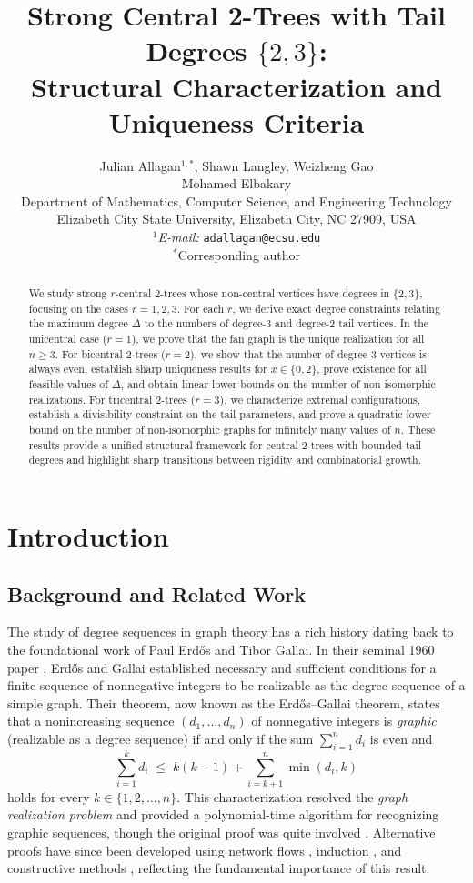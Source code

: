 \documentclass[12pt]{article}
\title{Strong Central 2-Trees with Tail Degrees \texorpdfstring{$\{2,3\}$}{\{2,3\}}:\\Structural Characterization and Uniqueness Criteria}
\author{Julian Allagan$^{1,*}$, Shawn Langley, Weizheng Gao \\ Mohamed Elbakary
 \\[0.3cm]
    \small Department of Mathematics, Computer Science, and Engineering Technology\\
    \small Elizabeth City State University, Elizabeth City, NC 27909, USA\\[0.3cm]
    \small $^{1}$\textit{E-mail:} \texttt{adallagan@ecsu.edu}\\
     \small $^{*}$Corresponding author
}
\date{}
\numberwithin{equation}{section}
\begin{document}
\maketitle

\begin{abstract}
We study strong $r$-central $2$-trees whose non-central vertices have degrees in $\{2,3\}$, focusing on the cases $r=1,2,3$. 
For each $r$, we derive exact degree constraints relating the maximum degree $\Delta$ to the numbers of degree-$3$ and degree-$2$ tail vertices.
In the unicentral case ($r=1$), we prove that the fan graph is the unique realization for all $n\ge 3$.
For bicentral $2$-trees ($r=2$), we show that the number of degree-$3$ vertices is always even, establish sharp uniqueness results for $x\in\{0,2\}$, prove existence for all feasible values of $\Delta$, and obtain linear lower bounds on the number of non-isomorphic realizations.
For tricentral $2$-trees ($r=3$), we characterize extremal configurations, establish a divisibility constraint on the tail parameters, and prove a quadratic lower bound on the number of non-isomorphic graphs for infinitely many values of $n$.
These results provide a unified structural framework for central $2$-trees with bounded tail degrees and highlight sharp transitions between rigidity and combinatorial growth.
\end{abstract}

\section{Introduction}

\subsection{Background and Related Work}

The study of degree sequences in graph theory has a rich history dating back to the foundational work of Paul Erd\H{o}s and Tibor Gallai. 
In their seminal 1960 paper \cite{erdos1960}, Erd\H{o}s and Gallai established necessary and sufficient conditions for a finite sequence of nonnegative integers to be realizable as the degree sequence of a simple graph.
Their theorem, now known as the Erd\H{o}s--Gallai theorem, states that a nonincreasing sequence $(d_1,\ldots,d_n)$ of nonnegative integers is \emph{graphic} (realizable as a degree sequence) if and only if the sum $\sum_{i=1}^n d_i$ is even and
\begin{equation}\label{eq:erdos-gallai}
\sum_{i=1}^k d_i \;\le\; k(k-1) + \sum_{i=k+1}^n \min(d_i,k)
\end{equation}
holds for every $k \in \{1,2,\ldots,n\}$.
This characterization resolved the \emph{graph realization problem} and provided a polynomial-time algorithm for recognizing graphic sequences, though the original proof was quite involved \cite{choudum1986}.
Alternative proofs have since been developed using network flows \cite{berge1973}, induction \cite{choudum1986}, and constructive methods \cite{tripathi2010}, reflecting the fundamental importance of this result.
\end{document}
